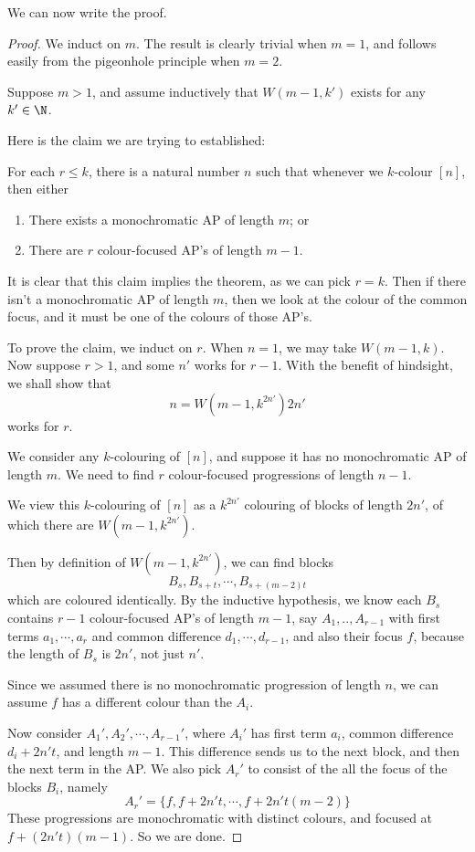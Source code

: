 \documentclass[a4paper]{article}
\begin{document}
We can now write the proof.
\begin{proof}
  We induct on $m$. The result is clearly trivial when $m = 1$, and follows easily from the pigeonhole principle when $m = 2$.

  Suppose $m > 1$, and assume inductively that $W(m - 1, k')$ exists for any $k' \in \N$.

  Here is the claim we are trying to established:
  \begin{claim}
    For each $r \leq k$, there is a natural number $n$ such that whenever we $k$-colour $[n]$, then either
    \begin{enumerate}
      \item There exists a monochromatic AP of length $m$; or
      \item There are $r$ colour-focused AP's of length $m - 1$.
    \end{enumerate}
  \end{claim}
  It is clear that this claim implies the theorem, as we can pick $r = k$. Then if there isn't a monochromatic AP of length $m$, then we look at the colour of the common focus, and it must be one of the colours of those AP's.

  To prove the claim, we induct on $r$. When $n = 1$, we may take $W(m - 1, k)$. Now suppose $r > 1$, and some $n'$ works for $r - 1$. With the benefit of hindsight, we shall show that
  \[
    n = W(m - 1, k^{2n'}) 2n'
  \]
  works for $r$.

  We consider any $k$-colouring of $[n]$, and suppose it has no monochromatic AP of length $m$. We need to find $r$ colour-focused progressions of length $n - 1$.

  We view this $k$-colouring of $[n]$ as a $k^{2n'}$ colouring of blocks of length $2n'$, of which there are $W(m - 1, k^{2n'})$.

  Then by definition of $W(m - 1, k^{2n'})$, we can find blocks
  \[
    B_s, B_{s + t}, \cdots, B_{s + (m - 2)t}
  \]
  which are coloured identically. By the inductive hypothesis, we know each $B_s$ contains $r - 1$ colour-focused AP's of length $m - 1$, say $A_1, .., A_{r - 1}$ with first terms $a_1, \cdots, a_r$ and common difference $d_1 , \cdots, d_{r - 1}$, and also their focus $f$, because the length of $B_s$ is $2n'$, not just $n'$.

  Since we assumed there is no monochromatic progression of length $n$, we can assume $f$ has a different colour than the $A_i$.

  Now consider $A_1', A_2', \cdots, A_{r - 1}'$, where $A_i'$ has first term $a_i$, common difference $d_i + 2n't$, and length $m - 1$. This difference sends us to the next block, and then the next term in the AP. We also pick $A_r'$ to consist of the all the focus of the blocks $B_i$, namely
  \[
    A_r' = \{f, f + 2n't, \cdots, f + 2n't(m - 2)\}
  \]
  These progressions are monochromatic with distinct colours, and focused at $f + (2n' t)(m - 1)$. So we are done.
\end{proof}
\end{document}
